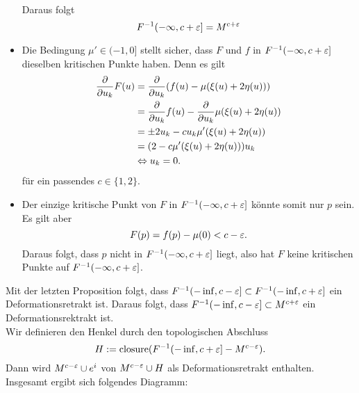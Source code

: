 \begin{Beweis}{}
\begin{itemize}
\begin{align*}
	\end{align*}
	Daraus folgt
	\[ F^{-1}(-\infty, c+ \varepsilon] = M^{c+\varepsilon} \]
	\item Die Bedingung $\mu' \in (-1,0]$ stellt sicher, dass $F$ und $f$ in $F^{-1}(-\infty, c+ \varepsilon]$ dieselben kritischen Punkte haben. Denn es gilt
	\begin{align*}
	\frac{\partial }{\partial u_k}F(u) &= \frac{\partial }{\partial u_k}(f(u) - \mu( \xi(u) + 2 \eta(u) )) \\
	&= \frac{\partial }{\partial u_k}f(u)-\frac{\partial }{\partial u_k}\mu( \xi(u) + 2 \eta(u) ) \\
	&= \pm2u_k - c u_k\mu'(\xi(u) + 2 \eta(u)) \\
	&= (2 - c\mu'(\xi(u) + 2 \eta(u)))u_k \\
	&\overset{}{\Leftrightarrow} u_k = 0.
	\end{align*}
	für ein passendes $c \in \{1,2\}$.
	\item Der einzige kritische Punkt von $F$ in $F^{-1}(-\infty, c+ \varepsilon]$ könnte somit nur $p$ sein. Es gilt aber
	\[ F(p) = f(p) - \mu(0) < c - \varepsilon. \]
	Daraus folgt, dass $p$ nicht in $F^{-1}(-\infty, c+ \varepsilon]$ liegt, also hat $F$ keine kritischen Punkte auf $F^{-1}(-\infty, c+ \varepsilon]$.
\end{itemize}
Mit der letzten Proposition folgt, dass $F^{-1}(-\inf,c - \varepsilon] \subset F^{-1}(-\inf,c + \varepsilon]$ ein Deformationsretrakt ist. Daraus folgt, dass $F^{-1}(-\inf,c - \varepsilon] \subset M^{c+\varepsilon}$ ein Deformationsrektrakt ist.\\
Wir definieren den Henkel durch den topologischen Abschluss
\[ H:= \mathrm{closure}(F^{-1}(-\inf,c + \varepsilon] - M^{c- \varepsilon}). \]
Dann wird $M^{c- \varepsilon} \cup e^i$ von $M^{c - \varepsilon}\cup H$ als Deformationsretrakt enthalten. Insgesamt ergibt sich folgendes Diagramm:
 \begin{center}
 \end{center}
\end{Beweis}

